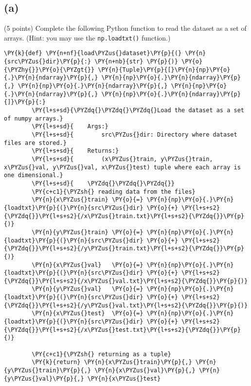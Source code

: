 \documentclass[a4paper,11pt]{article}%
\begin{document}
\hypertarget{a}{%
	\subsection{(a)}\label{a}}

(5 points) Complete the following Python function to read the dataset as
a set of arrays. (Hint: you may use the \texttt{np.loadtxt()} function.)

\begin{tcolorbox}[breakable, size=fbox, boxrule=1pt, pad at break*=1mm,colback=cellbackground, colframe=cellborder]
	\begin{Verbatim}[commandchars=\\\{\}]
		\PY{k}{def} \PY{n+nf}{load\PYZus{}dataset}\PY{p}{(} \PY{n}{src\PYZus{}dir}\PY{p}{:} \PY{n+nb}{str} \PY{p}{)} \PY{o}{\PYZhy{}}\PY{o}{\PYZgt{}} \PY{n}{Tuple}\PY{p}{[}\PY{n}{np}\PY{o}{.}\PY{n}{ndarray}\PY{p}{,} \PY{n}{np}\PY{o}{.}\PY{n}{ndarray}\PY{p}{,} \PY{n}{np}\PY{o}{.}\PY{n}{ndarray}\PY{p}{,} \PY{n}{np}\PY{o}{.}\PY{n}{ndarray}\PY{p}{,} \PY{n}{np}\PY{o}{.}\PY{n}{ndarray}\PY{p}{]}\PY{p}{:}
		\PY{l+s+sd}{\PYZdq{}\PYZdq{}\PYZdq{}Load the dataset as a set of numpy arrays.}
		\PY{l+s+sd}{    Args:}
		\PY{l+s+sd}{        src\PYZus{}dir: Directory where dataset files are stored.}
		\PY{l+s+sd}{    Returns:}
		\PY{l+s+sd}{        (x\PYZus{}train, y\PYZus{}train, x\PYZus{}val, y\PYZus{}val, x\PYZus{}test) tuple where each array is one dimensional.}
		\PY{l+s+sd}{    \PYZdq{}\PYZdq{}\PYZdq{}}
		\PY{c+c1}{\PYZsh{} reading data from the files}
		\PY{n}{x\PYZus{}train} \PY{o}{=} \PY{n}{np}\PY{o}{.}\PY{n}{loadtxt}\PY{p}{(}\PY{n}{src\PYZus{}dir} \PY{o}{+} \PY{l+s+s2}{\PYZdq{}}\PY{l+s+s2}{/x\PYZus{}train.txt}\PY{l+s+s2}{\PYZdq{}}\PY{p}{)}
		\PY{n}{y\PYZus{}train} \PY{o}{=} \PY{n}{np}\PY{o}{.}\PY{n}{loadtxt}\PY{p}{(}\PY{n}{src\PYZus{}dir} \PY{o}{+} \PY{l+s+s2}{\PYZdq{}}\PY{l+s+s2}{/y\PYZus{}train.txt}\PY{l+s+s2}{\PYZdq{}}\PY{p}{)}
		\PY{n}{x\PYZus{}val}   \PY{o}{=} \PY{n}{np}\PY{o}{.}\PY{n}{loadtxt}\PY{p}{(}\PY{n}{src\PYZus{}dir} \PY{o}{+} \PY{l+s+s2}{\PYZdq{}}\PY{l+s+s2}{/x\PYZus{}val.txt}\PY{l+s+s2}{\PYZdq{}}\PY{p}{)}
		\PY{n}{y\PYZus{}val}   \PY{o}{=} \PY{n}{np}\PY{o}{.}\PY{n}{loadtxt}\PY{p}{(}\PY{n}{src\PYZus{}dir} \PY{o}{+} \PY{l+s+s2}{\PYZdq{}}\PY{l+s+s2}{/y\PYZus{}val.txt}\PY{l+s+s2}{\PYZdq{}}\PY{p}{)}
		\PY{n}{x\PYZus{}test}  \PY{o}{=} \PY{n}{np}\PY{o}{.}\PY{n}{loadtxt}\PY{p}{(}\PY{n}{src\PYZus{}dir} \PY{o}{+} \PY{l+s+s2}{\PYZdq{}}\PY{l+s+s2}{/x\PYZus{}test.txt}\PY{l+s+s2}{\PYZdq{}}\PY{p}{)}
		
		\PY{c+c1}{\PYZsh{} returning as a tuple}
		\PY{k}{return} \PY{n}{x\PYZus{}train}\PY{p}{,} \PY{n}{y\PYZus{}train}\PY{p}{,} \PY{n}{x\PYZus{}val}\PY{p}{,} \PY{n}{y\PYZus{}val}\PY{p}{,} \PY{n}{x\PYZus{}test}
	\end{Verbatim}
\end{tcolorbox}
\end{document}
